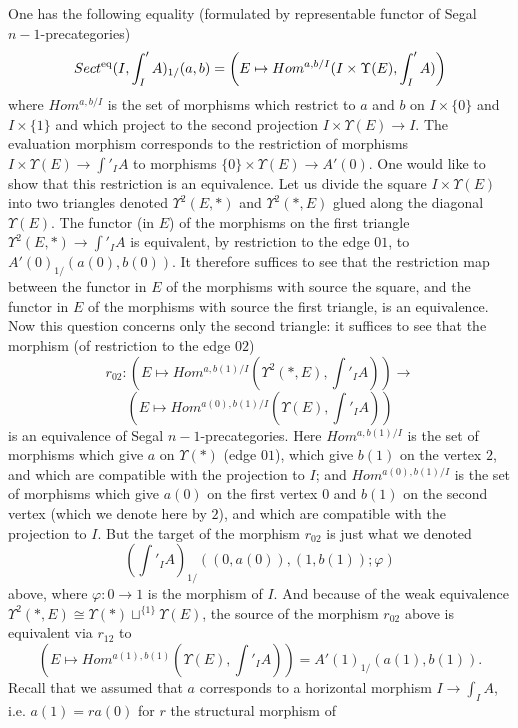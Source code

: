 One has the following equality
(formulated by representable functor
of Segal $n-1$-precategories)
$$
Sect ^{\rm eq}(I, \int '_IA)_{1/}(a,b)= \left(
E\mapsto Hom ^{a,b/I}(I\times \Upsilon (E), \int '_IA)
\right)
$$
where $Hom ^{a,b/I}$ is the set of morphisms which restrict to $a$
and $b$ on $I \times \{ 0\}$ and $I\times \{ 1\}$ and which project to
the second projection $I\times \Upsilon (E)\rightarrow I$.
The evaluation morphism corresponds to the restriction of morphisms $I\times
\Upsilon (E)\rightarrow \int '_IA$ to morphisms $\{ 0\} \times \Upsilon
(E) \rightarrow A'(0)$. One would like to show that this restriction is an
equivalence. Let us divide the square $I\times \Upsilon (E)$ into two triangles
denoted $\Upsilon ^2(E,\ast )$ and $\Upsilon ^2(\ast , E)$ glued along
the diagonal $\Upsilon (E)$. The functor (in $E$) of the morphisms on the first
triangle $\Upsilon ^2(E, \ast )\rightarrow \int '_IA$ is equivalent, by
restriction to the edge $01$, to $A'(0)_{1/}(a(0), b(0))$.
It therefore suffices to see that the restriction map between the functor
in $E$ of the
morphisms with source the square, and the functor in $E$ of the morphisms
with source the first
triangle, is an equivalence.
Now this question concerns only the
second triangle: it suffices to see that the morphism (of restriction to
the edge $02$)
$$
r_{02}:\left(
E\mapsto Hom ^{a,b(1)/I}(\Upsilon ^2(\ast , E), \int '_IA)
\right) \rightarrow
$$
$$
\left(
E\mapsto Hom ^{a(0),b(1)/I}( \Upsilon (E), \int '_IA)
\right)
$$
is an equivalence of Segal $n-1$-precategories. Here
$Hom ^{a,b(1)/I}$ is the set of morphisms which give $a$ on $\Upsilon
(\ast )$ (edge $01$), which give $b(1)$ on the vertex $2$, and which are
compatible with the projection to $I$; and
$Hom ^{a(0),b(1)/I}$ is the set of morphisms which give $a(0)$ on the
first vertex $0$ and $b(1)$ on the second vertex (which we denote here by $2$),
and which are compatible with the projection to $I$. But
the target
of the morphism
$r_{02}$ is just what we denoted
$$
(\int '_IA)_{1/}((0,a(0)), (1,b(1)); \varphi )
$$
above, where $\varphi : 0\rightarrow 1$ is the morphism of $I$. And
because of the weak
equivalence $\Upsilon ^2(\ast , E)\cong \Upsilon (\ast )\sqcup ^{\{ 1\} } \Upsilon
(E)$,
the source
of the morphism $r_{02}$ above is equivalent via
$r_{12}$ to
$$
\left(
E\mapsto Hom ^{a(1),b(1)}(\Upsilon ( E), \int '_IA)
\right) = A'(1)_{1/}(a(1), b(1)).
$$
Recall that we assumed that $a$ corresponds to a horizontal morphism
$I\rightarrow \int _IA$, i.e. $a(1)=ra(0)$ for $r$ the structural morphism of
